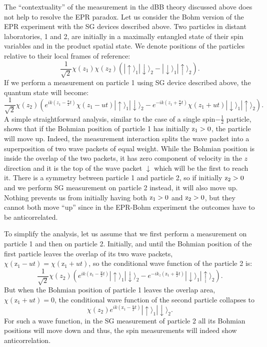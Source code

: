 \documentclass[preprint,tightenlines]{elsarticle}
\begin{document}
The ``contextuality'' of the measurement in the dBB theory discussed
above does not help to resolve the EPR paradox. Let us consider the
Bohm version of the EPR experiment with the SG devices
described above. Two particles in distant
laboratories, 1 and 2, are  initially in a maximally entangled state of their
spin variables and  in the product spatial state. We denote positions of the particles relative to their local frames
of reference:
 \begin{equation}
\frac{1}{\sqrt{2}}\chi(z_{1})\chi(z_{2})(|\uparrow\rangle_{1}|\downarrow\rangle_{2}-|\downarrow\rangle_{1}|\uparrow\rangle_{2}).
\end{equation}
 If we perform a measurement on particle 1 using SG device
described above, the quantum state will become:
 \begin{equation}
\frac{1}{\sqrt{2}}\chi(z_{2})\left(e^{ik(z_{1}-\frac{u}{2}t)}\chi(z_{1}-ut)|\uparrow\rangle_{1}|\downarrow\rangle_{2}-e^{-ik(z_{1}
+\frac{u}{2}t)}\chi(z_{1}+ut)|\downarrow\rangle_{1}|\uparrow\rangle_{2}\right).
\end{equation}
A simple straightforward analysis, similar to the case of a single
spin$-\frac{1}{2}$ particle, shows that if the Bohmian position of
particle 1 has initially ${\rm z}_{1}>0$, the particle will move
up. Indeed, the measurement interaction splits the wave packet into
a superposition of two wave packets of equal weight. While the Bohmian
position is inside the overlap of the two packets, it has zero component
of velocity in the $z$ direction and it is the top of the wave packet  $\downarrow$
which will be the first to reach it. There is a symmetry between particle
1 and particle 2, so if initially ${\rm z}_{2}>0$ and we perform
SG measurement on particle 2 instead, it will also move
up. Nothing prevents us from initially having both ${\rm z}_{1}>0$
and ${\rm z}_{2}>0$, but they cannot both move ``up'' since in
the EPR-Bohm experiment the outcomes have to be anticorrelated.

To simplify the analysis, let us assume that we first perform a measurement
on particle 1 and then on particle 2. Initially, and until the Bohmian
position of the first particle leaves the overlap of its two wave
packets, $\chi({\text{z}}_{1}-ut)=\chi({\text{z}}_{1}+ut)$, so the
conditional wave function of the particle 2 is:
\begin{equation}
\frac{1}{\sqrt{2}}\chi(z_{2})\left(e^{ik({\text{z}}_{1}-\frac{u}{2}t)}|\uparrow\rangle_{1}|\downarrow\rangle_{2}-e^{-ik_{z}({\text{z}}_{1}
+\frac{u}{2}t)}|\downarrow\rangle_{1}|\uparrow\rangle_{2}\right).
\end{equation}
 But when the Bohmian position of particle 1 leaves the overlap area,
$\chi({\text{z}}_{1}+ut)=0$, the conditional wave function of the
second particle collapses to
\begin{equation}
\chi(z_{2}) e^{ik({\text{z}}_{1}-\frac{u}{2}t)}|\uparrow\rangle_{1}|\downarrow\rangle_{2}.
\end{equation}
 For such a wave function, in the SG measurement of particle 2 all its Bohmian positions  will
move down and thus, the spin measurements will indeed show anticorrelation.
\end{document}
